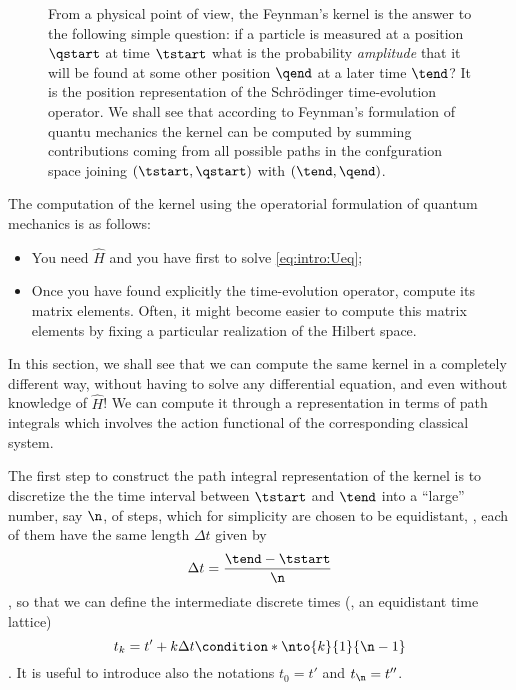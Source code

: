 \begin{figure}
   \centering
   \caption{From a physical point of view, the Feynman's kernel is the answer
      to the following simple question: if a particle is measured at a position $\qstart$ at time
      $\tstart$ what is the probability \emph{amplitude} that it will be found
      at some other position $\qend$ at a later time $\tend$? It is the
      position representation of the Schr\"odinger time-evolution operator. We shall see that
      according to Feynman's formulation of quantu mechanics the kernel can be
      computed by summing contributions coming from all possible paths in the
      confguration space joining
      $(\tstart, \qstart)$ with $(\tend, \qend)$.\label{fig:multiple paths}}
\end{figure}


The  computation of the
kernel using the operatorial formulation of quantum mechanics is as follows:
\begin{itemize}
   \item You need $\hat{H}$ and you have first to solve \cref{eq:intro:Ueq};
   \item Once you have found explicitly the time-evolution operator, compute
      its matrix elements. Often, it might become easier to compute this matrix
      elements by fixing a particular realization of the Hilbert space.
\end{itemize}
In this section, we shall see that we can compute the same kernel in a
completely different way, without having to solve any differential equation,
and even without knowledge of $\hat{H}$! We can compute it through a
representation in terms of path integrals which involves the action functional
of the corresponding classical system.



The  first step to construct the path integral representation of the kernel is to discretize the the time interval between $\tstart$ and
$\tend$
into a ``large'' number, say $\n$, of steps, which for simplicity are chosen to be
equidistant, \ie, each of them have the same length $\Delta t $ given by
\begin{dmath*}
\Delta t  = \frac{\tend - \tstart}{\n} 
\end{dmath*},
so that  we can define  the intermediate discrete times (\ie, an equidistant
time lattice)
\begin{dmath*}
   t_{k} = t' +  k \Delta t \condition*{\nto{k}{1}{\n-1}}
\end{dmath*}.
It is useful to introduce also the notations $t_{0} = t'$ and $ t_{\n}
= t''$.

